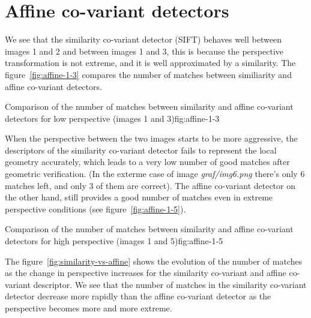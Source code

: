 \documentclass{article}
\begin{document}

\section{Affine co-variant detectors}



We see that the similarity co-variant detector (SIFT) behaves
well between images 1 and 2 and between images 1 and 3, this is
because the perspective transformation is not extreme, and it is well
approximated by a similarity. The figure~\ref{fig:affine-1-3} compares
the number of matches between similiarity and affine co-variant
detectors.

        {}
        {Comparison of the number of matches between similarity and affine co-variant detectors for low perspective (images 1 and 3)}{fig:affine-1-3}

When the perspective between the two images starts to be more
aggressive, the descriptors of the similarity co-variant detector
fails to represent the local geometry accurately, which leads to a
very low number of good matches after geometric verification.  (In the
exterme case of image \emph{graf/img6.png} there's only 6 matches
left, and only 3 of them are correct). The affine co-variant detector
on the other hand, still provides a good number of matches even in
extreme perspective conditions (see figure~\ref{fig:affine-1-5}).

        {}
        {Comparison of the number of matches between similarity and affine co-variant detectors for high perspective (images 1 and 5)}{fig:affine-1-5}

The figure~\ref{fig:similarity-vs-affine} shows the evolution of the
number of matches as the change in perspective increases for the
similarity co-variant and affine co-variant descriptor. We see that
the number of matches in the similarity co-variant detector decrease
more rapidly than the affine co-variant detector as the perspective
becomes more and more extreme.
\end{document}

